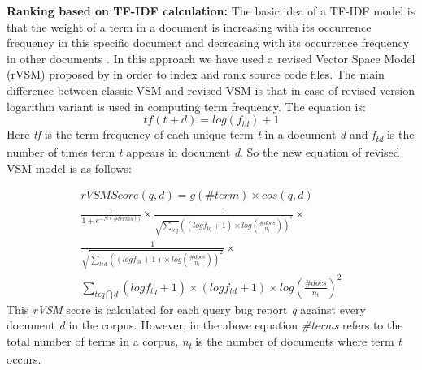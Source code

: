 \documentclass[conference]{IEEEtran}
\begin{document}
\textbf{Ranking based on TF-IDF calculation:}
The basic idea of a TF-IDF model is that the weight of a term in a document is increasing with its occurrence frequency in this specific document and decreasing with its occurrence frequency in other documents \cite{Jian}.
In this approach we have used a revised Vector Space Model (rVSM) proposed by \citet{Jian} in order to index and rank source code files. 
The main difference between classic VSM and revised VSM is that in case of revised version logarithm variant is used in computing term frequency. The equation is:
\begin{equation}
tf(t+d)=log(f_{td})+1
\end{equation}
Here \textit{tf} is the term frequency of each unique term \textit{t} in a document \textit{d} and \textit{f\textsubscript{td}} is the number of times term \textit{t} appears in document \textit{d}.
So the new equation of revised VSM model is as follows:

\begin{multline}\label{rVSMequation}
rVSMScore(q,d)=g(\#term)\times cos(q,d)
\\
\frac{1}{1+e^{-N(\#terms))}}\times \frac{1}{\sqrt{\sum_{t\epsilon q}}((logf_{tq}+1)\times log(\frac{\#docs}{n_{t}}))^{^{2}}}\times 
\\
\frac{1}{\sqrt{\sum_{t\epsilon d}((log {f_{td}+1})\times log(\frac{\#docs}{n_{t}}))^{2}}}\times
\\
\sum_{t\epsilon q\bigcap d}(logf_{tq}+1)\times (logf_{td}+1)\times log(\frac{\#docs}{n_{t}})^{2}
\end{multline}
This \textit{rVSM} score is calculated for each query bug report \textit{q} against every document \textit{d} in the corpus. However, in the above equation \textit{\#terms} refers to the total number of terms in a corpus, \textit{n\textsubscript{t}} is the number of documents where term \textit{t} occurs.
\end{document}
